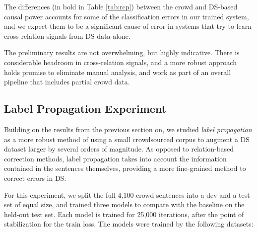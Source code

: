 \begin{table}[htb!]
\centering
{}
\caption{Precision \& Recall at 20,000 training steps.}
\label{tab:cnn_res}
\end{table}

The differences (in bold in Table \ref{tab:rcp}) between the crowd and DS-based causal power accounts for some of the classification errors in our trained system, and we expect them to be a significant cause of error in systems that try to learn cross-relation signals from DS data alone.

The preliminary results are not overwhelming, but highly indicative. There is considerable headroom in cross-relation signals, and a more robust approach holds promise to eliminate manual analysis, and work as part of an overall pipeline that includes partial crowd data.


\subsection{Label Propagation Experiment}
\label{sec:lp-eval}

Building on the results from the previous section on, we studied \textit{label propagation} as a more robust method of using a small crowdsourced corpus to augment a DS dataset larger by several orders of magnitude. As opposed to relation-based correction methods, label propagation takes into account the information contained in the sentences themselves, providing a more fine-grained method to correct errors in DS.

For this experiment, we split the full 4,100 crowd sentences into a dev and a test set of equal size, and trained three models to compare with the baseline on the held-out test set. Each model is trained for 25,000 iterations, after the point of stabilization for the train loss. The models were trained by the following datasets:

